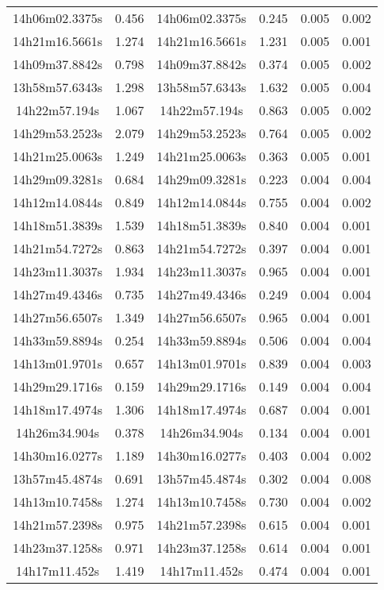 \begin{table}
\begin{tabular}{cccccc}
14h06m02.3375s & 0.456 & 14h06m02.3375s & 0.245 & 0.005 & 0.002 \\
14h21m16.5661s & 1.274 & 14h21m16.5661s & 1.231 & 0.005 & 0.001 \\
14h09m37.8842s & 0.798 & 14h09m37.8842s & 0.374 & 0.005 & 0.002 \\
13h58m57.6343s & 1.298 & 13h58m57.6343s & 1.632 & 0.005 & 0.004 \\
14h22m57.194s & 1.067 & 14h22m57.194s & 0.863 & 0.005 & 0.002 \\
14h29m53.2523s & 2.079 & 14h29m53.2523s & 0.764 & 0.005 & 0.002 \\
14h21m25.0063s & 1.249 & 14h21m25.0063s & 0.363 & 0.005 & 0.001 \\
14h29m09.3281s & 0.684 & 14h29m09.3281s & 0.223 & 0.004 & 0.004 \\
14h12m14.0844s & 0.849 & 14h12m14.0844s & 0.755 & 0.004 & 0.002 \\
14h18m51.3839s & 1.539 & 14h18m51.3839s & 0.840 & 0.004 & 0.001 \\
14h21m54.7272s & 0.863 & 14h21m54.7272s & 0.397 & 0.004 & 0.001 \\
14h23m11.3037s & 1.934 & 14h23m11.3037s & 0.965 & 0.004 & 0.001 \\
14h27m49.4346s & 0.735 & 14h27m49.4346s & 0.249 & 0.004 & 0.004 \\
14h27m56.6507s & 1.349 & 14h27m56.6507s & 0.965 & 0.004 & 0.001 \\
14h33m59.8894s & 0.254 & 14h33m59.8894s & 0.506 & 0.004 & 0.004 \\
14h13m01.9701s & 0.657 & 14h13m01.9701s & 0.839 & 0.004 & 0.003 \\
14h29m29.1716s & 0.159 & 14h29m29.1716s & 0.149 & 0.004 & 0.004 \\
14h18m17.4974s & 1.306 & 14h18m17.4974s & 0.687 & 0.004 & 0.001 \\
14h26m34.904s & 0.378 & 14h26m34.904s & 0.134 & 0.004 & 0.001 \\
14h30m16.0277s & 1.189 & 14h30m16.0277s & 0.403 & 0.004 & 0.002 \\
13h57m45.4874s & 0.691 & 13h57m45.4874s & 0.302 & 0.004 & 0.008 \\
14h13m10.7458s & 1.274 & 14h13m10.7458s & 0.730 & 0.004 & 0.002 \\
14h21m57.2398s & 0.975 & 14h21m57.2398s & 0.615 & 0.004 & 0.001 \\
14h23m37.1258s & 0.971 & 14h23m37.1258s & 0.614 & 0.004 & 0.001 \\
14h17m11.452s & 1.419 & 14h17m11.452s & 0.474 & 0.004 & 0.001 \\

\end{tabular}
\end{table}
